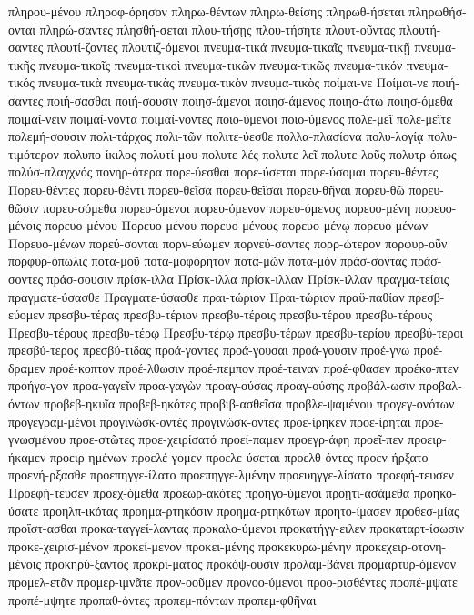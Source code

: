{πληρου-μένου
πληροφ-όρησον
πληρω-θέντων
πληρω-θείσης
πληρωθ-ήσεται
πληρωθήσ-ονται
πληρώ-σαντες
πλησθή-σεται
πλου-τήσῃς
πλου-τήσητε
πλουτ-οῦντας
πλουτή-σαντες
πλουτί-ζοντες
πλουτιζ-όμενοι
πνευμα-τικά
πνευμα-τικαῖς
πνευμα-τικῇ
πνευμα-τικῆς
πνευμα-τικοῖς
πνευμα-τικοὶ
πνευμα-τικῶν
πνευμα-τικῶς
πνευμα-τικόν
πνευμα-τικός
πνευμα-τικὰ
πνευμα-τικὰς
πνευμα-τικὸν
πνευμα-τικὸς
ποίμαι-νε
Ποίμαι-νε
ποιή-σαντες
ποιή-σασθαι
ποιή-σουσιν
ποιησ-άμενοι
ποιησ-άμενος
ποιησ-άτω
ποιησ-όμεθα
ποιμαί-νειν
ποιμαί-νοντα
ποιμαί-νοντες
ποιο-ύμενοι
ποιο-ύμενος
πολε-μεῖ
πολε-μεῖτε
πολεμή-σουσιν
πολι-τάρχας
πολι-τῶν
πολιτε-ύεσθε
πολλα-πλασίονα
πολυ-λογίᾳ
πολυ-τιμότερον
πολυπο-ίκιλος
πολυτί-μου
πολυτε-λές
πολυτε-λεῖ
πολυτε-λοῦς
πολυτρ-όπως
πολύσ-πλαγχνός
πονηρ-ότερα
πορε-ύεσθαι
πορε-ύσεται
πορε-ύσομαι
πορευ-θέντες
Πορευ-θέντες
πορευ-θέντι
πορευ-θεῖσα
πορευ-θεῖσαι
πορευ-θῆναι
πορευ-θῶ
πορευ-θῶσιν
πορευ-σόμεθα
πορευ-όμενοι
πορευ-όμενον
πορευ-όμενος
πορευο-μένη
πορευο-μένοις
πορευο-μένου
Πορευο-μένου
πορευο-μένους
πορευο-μένῳ
πορευο-μένων
Πορευο-μένων
πορεύ-σονται
πορν-εύωμεν
πορνεύ-σαντες
πορρ-ώτερον
πορφυρ-οῦν
πορφυρ-όπωλις
ποτα-μοῦ
ποτα-μοφόρητον
ποτα-μῶν
ποτα-μόν
πράσ-σοντας
πράσ-σοντες
πράσ-σουσιν
πρίσκ-ιλλα
Πρίσκ-ιλλα
πρίσκ-ιλλαν
Πρίσκ-ιλλαν
πραγμα-τείαις
πραγματε-ύσασθε
Πραγματε-ύσασθε
πραι-τώριον
Πραι-τώριον
πραϋ-παθίαν
πρεσβ-εύομεν
πρεσβυ-τέρας
πρεσβυ-τέριον
πρεσβυ-τέροις
πρεσβυ-τέρου
πρεσβυ-τέρους
Πρεσβυ-τέρους
πρεσβυ-τέρῳ
Πρεσβυ-τέρῳ
πρεσβυ-τέρων
πρεσβυ-τερίου
πρεσβύ-τεροι
πρεσβύ-τερος
πρεσβύ-τιδας
προά-γοντες
προά-γουσαι
προά-γουσιν
προέ-γνω
προέ-δραμεν
προέ-κοπτον
προέ-λθωσιν
προέ-πεμπον
προέ-τειναν
προέ-φθασεν
προέκο-πτεν
προήγα-γον
προα-γαγεῖν
προα-γαγὼν
προαγ-ούσας
προαγ-ούσης
προβάλ-ωσιν
προβαλ-όντων
προβεβ-ηκυῖα
προβεβ-ηκότες
προβιβ-ασθεῖσα
προβλε-ψαμένου
προγεγ-ονότων
προγεγραμ-μένοι
προγινώσκ-οντές
προγινώσκ-οντες
προε-ίρηκεν
προε-ίρηται
προε-γνωσμένου
προε-στῶτες
προε-χειρίσατό
προεί-παμεν
προεγρ-άφη
προεῖ-πεν
προειρ-ήκαμεν
προειρ-ημένων
προελέ-γομεν
προελε-ύσεται
προελθ-όντες
προεν-ήρξατο
προενή-ρξασθε
προεπηγγε-ίλατο
προεπηγγε-λμένην
προευηγγε-λίσατο
προεφή-τευσεν
Προεφή-τευσεν
προεχ-όμεθα
προεωρ-ακότες
προηγο-ύμενοι
προῃτι-ασάμεθα
προηκο-ύσατε
προηλπ-ικότας
προημα-ρτηκόσιν
προημα-ρτηκότων
προητο-ίμασεν
προθεσ-μίας
προΐστ-ασθαι
προκα-ταγγεί-λαντας
προκαλο-ύμενοι
προκατήγγ-ειλεν
προκαταρτ-ίσωσιν
προκε-χειρισ-μένον
προκεί-μενον
προκει-μένης
προκεκυρω-μένην
προκεχειρ-οτονη-μένοις
προκηρύ-ξαντος
προκρί-ματος
προκόψ-ουσιν
προλαμ-βάνει
προμαρτυρ-όμενον
προμελ-ετᾶν
προμερ-ιμνᾶτε
προν-οοῦμεν
προνοο-ύμενοι
προο-ρισθέντες
προπέ-μψατε
προπέ-μψητε
προπαθ-όντες
προπεμ-πόντων
προπεμ-φθῆναι
}

